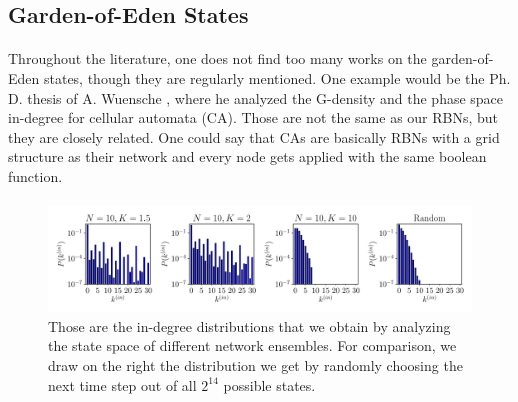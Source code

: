 \subsection{Garden-of-Eden States}
\paragraph*{}
Throughout the literature, one does not find too many works on the garden-of-Eden states, though they are regularly mentioned. One example would be the Ph. D. thesis of A. Wuensche \cite{wuensche1997attractor}, where he analyzed the G-density and the phase space in-degree for cellular automata (CA). Those are not the same as our RBNs, but they are closely related. One could say that CAs are basically RBNs with a grid structure as their network and every node gets applied with the same boolean function.

\paragraph*{}
\begin{figure}
	\includegraphics[width=\textwidth]{Plots/in_degree_N10}
	\centering
	\caption{Those are the in-degree distributions that we obtain by analyzing the state space of different network ensembles. For comparison, we draw on the right the distribution we get by randomly choosing the next time step out of all $2^{14}$ possible states.}
	\label{fig:in-degree}
\end{figure}

